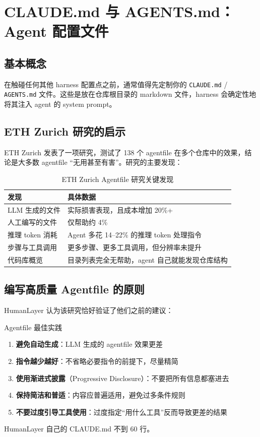 \section{CLAUDE.md 与 AGENTS.md：Agent 配置文件}

\subsection{基本概念}

在触碰任何其他 harness 配置点之前，通常值得先定制你的 \texttt{CLAUDE.md} / \texttt{AGENTS.md} 文件。这些是放在仓库根目录的 markdown 文件，harness 会确定性地将其注入 agent 的 system prompt。

\subsection{ETH Zurich 研究的启示}

ETH Zurich 发表了一项研究，测试了 138 个 agentfile 在多个仓库中的效果，结论是大多数 agentfile ``无用甚至有害''。研究的主要发现：

\begin{table}[H]
\centering
\caption{ETH Zurich Agentfile 研究关键发现}
\begin{tabular}{@{}p{5cm}p{8cm}@{}}
\toprule
\textbf{发现} & \textbf{具体数据} \\
\midrule
LLM 生成的文件 & 实际损害表现，且成本增加 20\%+ \\
人工编写的文件 & 仅帮助约 4\% \\
推理 token 消耗 & Agent 多花 14--22\% 的推理 token 处理指令 \\
步骤与工具调用 & 更多步骤、更多工具调用，但分辨率未提升 \\
代码库概览 & 目录列表完全无帮助，agent 自己就能发现仓库结构 \\
\bottomrule
\end{tabular}
\end{table}

\subsection{编写高质量 Agentfile 的原则}

HumanLayer 认为该研究恰好验证了他们之前的建议：

\begin{importantbox}{Agentfile 最佳实践}
\begin{enumerate}[leftmargin=1.5em]
    \item \textbf{避免自动生成}：LLM 生成的 agentfile 效果更差
    \item \textbf{指令越少越好}：不省略必要指令的前提下，尽量精简
    \item \textbf{使用渐进式披露}（Progressive Disclosure）：不要把所有信息都塞进去
    \item \textbf{保持简洁和普适}：内容应普遍适用，避免过多条件规则
    \item \textbf{不要过度引导工具使用}：过度指定``用什么工具''反而导致更差的结果
\end{enumerate}
HumanLayer 自己的 CLAUDE.md 不到 60 行。
\end{importantbox}


